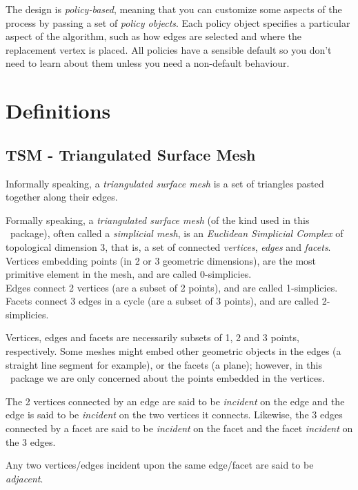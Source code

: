 The design is {\em policy-based}, meaning that you can customize some aspects of the process by passing a set of {\em policy objects}. Each policy object specifies a particular aspect of the algorithm, such as how edges are selected and where the replacement vertex is placed. All policies have a sensible default so you don't need to learn about them unless you need a non-default behaviour.

\section{Definitions\label{SurfaceMeshSimplification:SecDefinitions}}

\subsection{TSM - Triangulated Surface Mesh}

Informally speaking, a {\em triangulated surface mesh} is a set of triangles pasted together along their edges.

Formally speaking, a {\em triangulated surface mesh} (of the kind used in this \cgal\ package), often called a {\em simplicial mesh}, is an {\em Euclidean Simplicial Complex} of topological dimension 3, that is, a set of connected {\em vertices}, {\em edges} and {\em facets}.\\
Vertices embedding points (in 2 or 3 geometric dimensions), are the most primitive element in the mesh, and are called 0-simplicies.\\
Edges connect 2 vertices (are a subset of 2 points), and are called 1-simplicies.\\
Facets connect 3 edges in a cycle (are a subset of 3 points), and are called 2-simplicies.

Vertices, edges and facets are necessarily subsets of 1, 2 and 3 points, respectively. Some meshes might embed other geometric objects in the edges (a straight line segment for example), or the facets (a plane); however, in this \cgal\ package we are only concerned about the points embedded in the vertices.

The 2 vertices connected by an edge are said to be {\em incident} on the edge and the edge is said to be {\em incident} on the two vertices it connects. Likewise, the 3 edges connected by a facet are said to be {\em incident} on the facet and the facet {\em incident} on the 3 edges.

Any two vertices/edges incident upon the same edge/facet are said to be {\em adjacent}.

